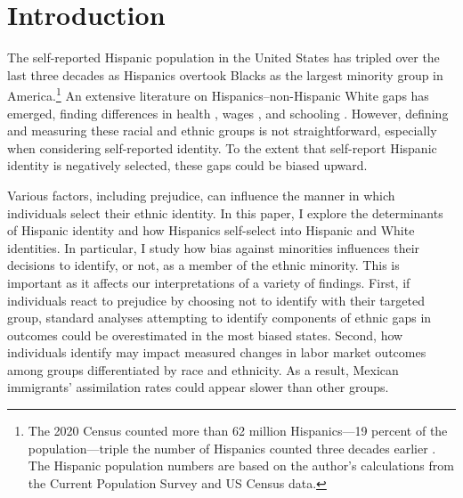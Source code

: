 \documentclass[12pt,english]{article}
\begin{document}
\section{Introduction}\label{sec:intro}

The self-reported Hispanic population in the United States has tripled over the last three decades as Hispanics overtook Blacks as the largest minority group in America.\footnote{The 2020 Census counted more than 62 million Hispanics---19 percent of the population---triple the number of Hispanics counted three decades earlier \autocite{floodsarahIntegratedPublicUse2021a}. The Hispanic population numbers are based on the author's calculations from the Current Population Survey and US Census data.} An extensive literature on Hispanics--non-Hispanic White gaps has emerged, finding differences in health \autocite{antecolUnhealthyAssimilationWhy2006,antmanEthnicAttritionObserved2016}, wages \autocite{trejoWhyMexicanAmericans1997}, and schooling \autocite{antmanHispanicAmericansLabor2022}. However, defining and measuring these racial and ethnic groups is not straightforward, especially when considering self-reported identity. To the extent that self-report Hispanic identity is negatively selected, these gaps could be biased upward.

Various factors, including prejudice, can influence the manner in which individuals select their ethnic identity. In this paper, I explore the determinants of Hispanic identity and how Hispanics self-select into Hispanic and White identities. In particular, I study how bias against minorities influences their decisions to identify, or not, as a member of the ethnic minority. This is important as it affects our interpretations of a variety of findings. First, if individuals react to prejudice by choosing not to identify with their targeted group, standard analyses attempting to identify components of ethnic gaps in outcomes could be overestimated in the most biased states. Second, how individuals identify may impact measured changes in labor market outcomes among groups differentiated by race and ethnicity. As a result, Mexican immigrants' assimilation rates could appear slower than other groups. 
\end{document}
